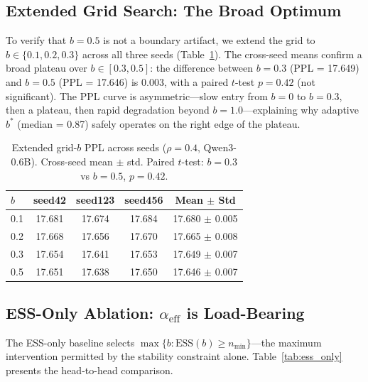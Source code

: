 \documentclass[11pt,a4paper]{article}
\newcommand{\bstar}{b^{*}}
\newcommand{\aeff}{\alpha_{\mathrm{eff}}}
\newcommand{\nmin}{n_{\min}}
\begin{document}
\subsection{Extended Grid Search: The Broad Optimum}
\label{sec:grid_extended}

To verify that $b{=}0.5$ is not a boundary artifact, we extend the grid to $b \in \{0.1, 0.2, 0.3\}$ across all three seeds (Table~\ref{tab:grid_extended}).
The cross-seed means confirm a broad plateau over $b \in [0.3, 0.5]$: the difference between $b{=}0.3$ (PPL = 17.649) and $b{=}0.5$ (PPL = 17.646) is 0.003, with a paired $t$-test $p = 0.42$ (not significant).
The PPL curve is asymmetric---slow entry from $b{=}0$ to $b{=}0.3$, then a plateau, then rapid degradation beyond $b{=}1.0$---explaining why adaptive $\bstar$ (median = 0.87) safely operates on the right edge of the plateau.

\begin{table}[t]
\centering
\small
\caption{Extended grid-$b$ PPL across seeds ($\rho{=}0.4$, Qwen3-0.6B). Cross-seed mean $\pm$ std. Paired $t$-test: $b{=}0.3$ vs $b{=}0.5$, $p = 0.42$.}
\label{tab:grid_extended}
\begin{tabular}{lcccc}
\toprule
$b$ & seed42 & seed123 & seed456 & Mean $\pm$ Std \\
\midrule
0.1 & 17.681 & 17.674 & 17.684 & 17.680 $\pm$ 0.005 \\
0.2 & 17.668 & 17.656 & 17.670 & 17.665 $\pm$ 0.008 \\
0.3 & 17.654 & 17.641 & 17.653 & 17.649 $\pm$ 0.007 \\
0.5 & 17.651 & 17.638 & 17.650 & 17.646 $\pm$ 0.007 \\
\bottomrule
\end{tabular}
\end{table}


\subsection{ESS-Only Ablation: $\aeff$ is Load-Bearing}
\label{sec:ess_only}

The ESS-only baseline selects $\max\{b : \mathrm{ESS}(b) \geq \nmin\}$---the maximum intervention permitted by the stability constraint alone.
Table~\ref{tab:ess_only} presents the head-to-head comparison.
\end{document}
